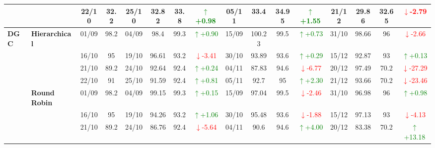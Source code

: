\documentclass{ieeeaccess}
\begin{document}
{\begin{longtable}{llcc|cccc|cccc|cccc}
&
& 22/10 & 32.2 & 25/10 & 32.82 & 33.8 & \textcolor{green}{\(\uparrow\)+0.98} & 05/11 & 33.4 & 34.95 & \textcolor{green}{\(\uparrow\)+1.55} & 21/12 & 29.86 & 32.65 & \textcolor{red}{\(\downarrow\)-2.79} \\
\midrule




\multirow{12}{*}{\textbf{DGC}} 
& \textbf{Hierarchical}
& 01/09 & 98.2 & 04/09 & 98.4 & 99.3 & \textcolor{green}{\(\uparrow\)+0.90} & 15/09 & 100.23 & 99.5 & \textcolor{green}{\(\uparrow\)+0.73} & 31/10 & 98.66 & 96 & \textcolor{red}{\(\downarrow\)-2.66} \\

&
& 16/10 & 95 & 19/10 & 96.61 & 93.2 & \textcolor{red}{\(\downarrow\)-3.41} & 30/10 & 93.89 & 93.6 & \textcolor{green}{\(\uparrow\)+0.29} & 15/12 & 92.87 & 93 & \textcolor{green}{\(\uparrow\)+0.13} \\

&
& 21/10 & 89.2 & 24/10 & 92.64 & 92.4 & \textcolor{green}{\(\uparrow\)+0.24} & 04/11 & 87.83 & 94.6 & \textcolor{red}{\(\downarrow\)-6.77} & 20/12 & 97.49 & 70.2 & \textcolor{red}{\(\downarrow\)-27.29} \\

&
& 22/10 & 91 & 25/10 & 91.59 & 92.4 & \textcolor{green}{\(\uparrow\)+0.81} & 05/11 & 92.7 & 95 & \textcolor{green}{\(\uparrow\)+2.30} & 21/12 & 93.66 & 70.2 & \textcolor{red}{\(\downarrow\)-23.46} \\
\cmidrule(lr){2-16}


& \textbf{Round Robin}
& 01/09 & 98.2 & 04/09 & 99.15 & 99.3 & \textcolor{green}{\(\uparrow\)+0.15} & 15/09 & 97.04 & 99.5 & \textcolor{red}{\(\downarrow\)-2.46} & 31/10 & 96.98 & 96 & \textcolor{green}{\(\uparrow\)+0.98} \\

&
& 16/10 & 95 & 19/10 & 94.26 & 93.2 & \textcolor{green}{\(\uparrow\)+1.06} & 30/10 & 95.48 & 93.6 & \textcolor{red}{\(\downarrow\)-1.88} & 15/12 & 97.13 & 93 & \textcolor{red}{\(\downarrow\)-4.13} \\

&
& 21/10 & 89.2 & 24/10 & 86.76 & 92.4 & \textcolor{red}{\(\downarrow\)-5.64} & 04/11 & 90.6 & 94.6 & \textcolor{green}{\(\uparrow\)+4.00} & 20/12 & 83.38 & 70.2 & \textcolor{green}{\(\uparrow\)+13.18} \\


\end{longtable}}
\end{document}
